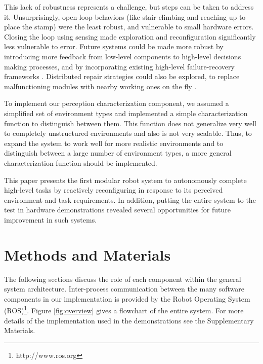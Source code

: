 \documentclass[12pt]{article}
\begin{document}
This lack of robustness represents a challenge, but steps can be taken to address it.  Unsurprisingly, open-loop behaviors (like stair-climbing and reaching up to place the stamp) were the least robust, and vulnerable to small hardware errors.  Closing the loop using sensing made exploration and reconfiguration significantly less vulnerable to error.  Future systems could be made more robust by introducing more feedback from low-level components to high-level decisions making processes, and by incorporating existing high-level failure-recovery frameworks \cite{Maniatopoulos16icra}.  Distributed repair strategies could also be explored, to replace malfunctioning modules with nearby working ones on the fly \cite{tomita1999self}.

To implement our perception characterization component, we assumed a simplified set of environment types and implemented a simple characterization function to distinguish between them. This function does not generalize very well to completely unstructured environments and also is not very scalable. Thus, to expand the system to work well for more realistic environments and to distinguish between a large number of environment types, a more general characterization function should be implemented. 

This paper presents the first modular robot system to autonomously complete high-level tasks by reactively reconfiguring in response to its perceived environment and task requirements. In addition, putting the entire system to the test in hardware demonstrations revealed several opportunities for future improvement in such systems.



\section{Methods and Materials}\label{sec:system}
%
The following sections discuss the role of each component within the general system architecture. Inter-process communication between the many software components in our implementation is provided by the Robot Operating System (ROS)\footnote{http://www.ros.org}. Figure \ref{fig:overview} gives a flowchart of the entire system. For more details of the implementation used in the demonstrations see the Supplementary Materials.
\end{document}
